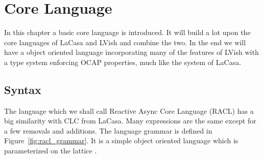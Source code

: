 \chapter{Core Language}
\label{cha:core_language}

In this chapter a basic core language is introduced. It will build a lot upon
the core languages of LaCasa and LVish and combine the two. In the end we will
have a object oriented language incorporating many of the features of LVish with
a type system enforcing OCAP properties, much like the system of LaCasa.

\section{Syntax}
\label{sec:syntax}

The language which we shall call Reactive Async Core Language (RACL) has a big
similarity with CLC from LaCasa. Many expressions are the same except for a few
removals and additions. The language grammar is defined in
Figure~\ref{fig:racl_grammar}. It is a simple object oriented language which is
parameterized on the lattice \LatVals{}.

